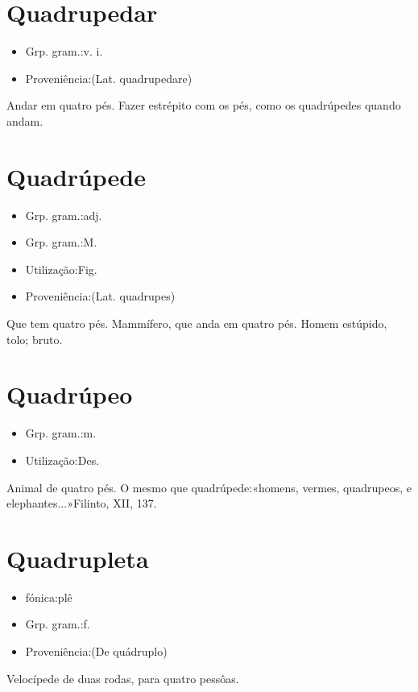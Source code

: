 \section{Quadrupedar}
\begin{itemize}
\item {Grp. gram.:v. i.}
\end{itemize}
\begin{itemize}
\item {Proveniência:(Lat. \textunderscore quadrupedare\textunderscore )}
\end{itemize}
Andar em quatro pés.
Fazer estrépito com os pés, como os quadrúpedes quando andam.
\section{Quadrúpede}
\begin{itemize}
\item {Grp. gram.:adj.}
\end{itemize}
\begin{itemize}
\item {Grp. gram.:M.}
\end{itemize}
\begin{itemize}
\item {Utilização:Fig.}
\end{itemize}
\begin{itemize}
\item {Proveniência:(Lat. \textunderscore quadrupes\textunderscore )}
\end{itemize}
Que tem quatro pés.
Mammífero, que anda em quatro pés.
Homem estúpido, tolo; bruto.
\section{Quadrúpeo}
\begin{itemize}
\item {Grp. gram.:m.}
\end{itemize}
\begin{itemize}
\item {Utilização:Des.}
\end{itemize}
Animal de quatro pés.
O mesmo que \textunderscore quadrúpede\textunderscore :«\textunderscore homens, vermes, quadrupeos, e elephantes...\textunderscore »Filinto, XII, 137.
\section{Quadrupleta}
\begin{itemize}
\item {fónica:plê}
\end{itemize}
\begin{itemize}
\item {Grp. gram.:f.}
\end{itemize}
\begin{itemize}
\item {Proveniência:(De \textunderscore quádruplo\textunderscore )}
\end{itemize}
Velocípede de duas rodas, para quatro pessôas.
